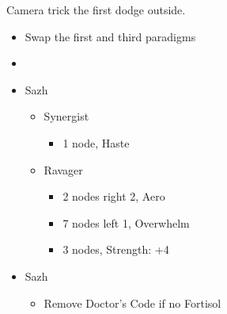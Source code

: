 \renewcommand{\first}{[1] Tide Turner (\syn/\sab)}
\renewcommand{\second}{[2] War and Peace (\com/\med)}
\renewcommand{\third}{[3] Slash \& Burn (\com/\rav)}
\renewcommand{\fourth}{[4] Dualcasting (\rav/\rav)}
\renewcommand{\fifth}{[5] Undermine (\rav/\sab)}
\renewcommand{\sixth}{[6] Divide \& Conquer (\com/\sab)}

Camera trick the first dodge outside.
\newpage
\begin{multicols}{2}
	\begin{menu}
		\begin{itemize}
			\paradigm
			\begin{itemize}
				\item Swap the first and third paradigms
				\item {}%
				      {\paradigmline[1]{\textit{\syn}}{\textit{\sab}}{}}%
				      {\paradigmline{\com}{\med}{}}%
				      {\paradigmline{\com}{\rav}{}}%
				      {\paradigmline{\rav}{\rav}{}}%
				      {\paradigmline{[\rav]}{(\sab)}{}}%
				      {\paradigmline{[\com]}{(\sab)}{}}
			\end{itemize}
			\crystarium
			\begin{itemize}
				\item Sazh
				      \begin{itemize}
					      \item Synergist
					            \begin{itemize}
						            \item 1 node, Haste
					            \end{itemize}
					      \item Ravager
					            \begin{itemize}
						            \item 2 nodes right 2, Aero
						            \item 7 nodes left 1, Overwhelm
						            \item 3 nodes, Strength: +4
					            \end{itemize}
				      \end{itemize}
			\end{itemize}
			\equip
			\begin{itemize}
				\item Sazh
				      \begin{itemize}
					      \item Remove Doctor's Code if no Fortisol
				      \end{itemize}
			\end{itemize}
		\end{itemize}
	\end{menu}


\end{multicols}
